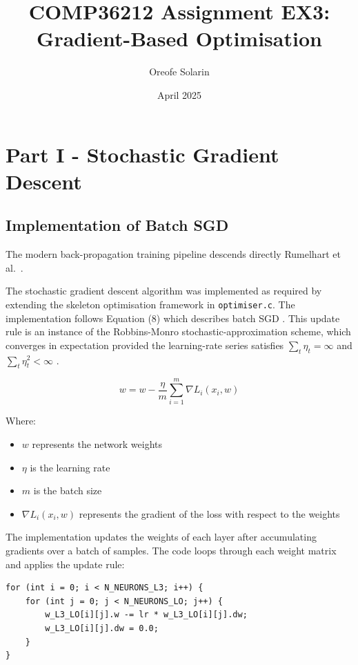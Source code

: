 \documentclass{article}
\title{COMP36212 Assignment EX3: Gradient-Based Optimisation}
\author{Oreofe Solarin}
\date{April 2025}
\begin{document}
\maketitle

\section{Part I - Stochastic Gradient Descent}

\subsection{Implementation of Batch SGD}

\noindent The modern back-propagation training pipeline descends directly 
Rumelhart et al.~\cite{rumelhart1986learning}.


The stochastic gradient descent algorithm was implemented as required 
by extending the skeleton optimisation framework in 
\texttt{optimiser.c}. The implementation follows Equation (8)
which describes batch SGD \cite{bottou2012sgdtricks}. This update rule is an instance of the Robbins-Monro stochastic-approximation scheme, 
which converges in expectation provided the learning-rate series satisfies 
\(\sum_t \eta_t=\infty\) and \(\sum_t \eta_t^2<\infty\) \cite{robbins1951stochastic}.

\begin{equation}
w = w - \frac{\eta}{m} \sum_{i=1}^{m}\nabla L_{i}(x_{i},w)
\end{equation}

\noindent Where:
\begin{itemize}
  \item $w$ represents the network weights
  \item $\eta$ is the learning rate
  \item $m$ is the batch size
  \item $\nabla L_{i}(x_{i},w)$ represents the gradient of the loss with respect to the weights
\end{itemize}

\noindent The implementation updates the weights of each layer 
after accumulating gradients over a batch of samples. 
The code loops through each weight matrix and applies the 
update rule:

\begin{verbatim}
for (int i = 0; i < N_NEURONS_L3; i++) {
    for (int j = 0; j < N_NEURONS_LO; j++) {
        w_L3_LO[i][j].w -= lr * w_L3_LO[i][j].dw;
        w_L3_LO[i][j].dw = 0.0;
    }
}
\end{verbatim}
\end{document}
